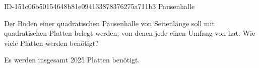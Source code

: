 \begin{exercise}
      {ID-151c06b50154648b81e094133878376275a711b3}
      {Pausenhalle}
  \ifproblem\problem\par
    Der Boden einer quadratischen Pausenhalle von  Seitenlänge soll
    mit quadratischen Platten belegt werden, von denen jede einen Umfang von
     hat. Wie viele Platten werden benötigt?
  \fi
  \ifoutcome\outcome\par
    Es werden insgesamt \num{2025} Platten benötigt.
  \fi
\end{exercise}
